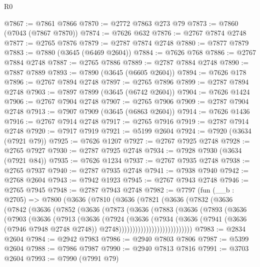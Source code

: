 \begin{lexlean}{R0}
\begin{coremodule}
@7867 := @7861 @7866
@7870 := @2772 @7863 @273 @79
@7873 := @7860 (@7043 (@7867 @7870))
@7874 := @7626 @632
@7876 := @2767 @7874 @2748
@7877 := @2765 @7876
@7879 := @2787 @7874 @2748
@7880 := @7877 @7879
@7883 := @7880 (@3645 (@6469 @2604))
@7884 := @7626 @768
@7886 := @2767 @7884 @2748
@7887 := @2765 @7886
@7889 := @2787 @7884 @2748
@7890 := @7887 @7889
@7893 := @7890 (@3645 (@6605 @2604))
@7894 := @7626 @178
@7896 := @2767 @7894 @2748
@7897 := @2765 @7896
@7899 := @2787 @7894 @2748
@7903 := @7897 @7899 (@3645 (@6742 @2604))
@7904 := @7626 @1424
@7906 := @2767 @7904 @2748
@7907 := @2765 @7906
@7909 := @2787 @7904 @2748
@7913 := @7907 @7909 (@3645 (@6863 @2604))
@7914 := @7626 @1436
@7916 := @2767 @7914 @2748
@7917 := @2765 @7916
@7919 := @2787 @7914 @2748
@7920 := @7917 @7919
@7921 := @5199 @2604
@7924 := @7920 (@3634 (@7921 @79))
@7925 := @7626 @1207
@7927 := @2767 @7925 @2748
@7928 := @2765 @7927
@7930 := @2787 @7925 @2748
@7934 := @7928 @7930 (@3634 (@7921 @84))
@7935 := @7626 @1234
@7937 := @2767 @7935 @2748
@7938 := @2765 @7937
@7940 := @2787 @7935 @2748
@7941 := @7938 @7940
@7942 := @2768 @2604
@7943 := @7942 @1923
@7945 := @2767 @7943 @2748
@7946 := @2765 @7945
@7948 := @2787 @7943 @2748
@7982 := @7797
    (fun (__b : @2705) =>
    @7800
      (@3636
        (@7810
          (@3636
            (@7821
              (@3636
                (@7832
                  (@3636
                    (@7842
                      (@3636
                        (@7852
                          (@3636
                            (@7873
                              (@3636
                                (@7883
                                  (@3636
                                    (@7893
                                      (@3636
                                        (@7903
                                          (@3636
                                            (@7913
                                              (@3636
                                                (@7924
                                                  (@3636
                                                    (@7934
                                                      (@3636
                                                        (@7941
                                                          (@3636 (@7946 @7948 @2748 @2748))
                                                          @2748)))))))))))))))))))))))))))
@7983 := @2834 @2604
@7984 := @2942 @7983
@7986 := @2940 @7803 @7806
@7987 := @5399 @2604
@7988 := @7986 @7987
@7990 := @2940 @7813 @7816
@7991 := @3703 @2604
@7993 := @7990 (@7991 @79)

\end{coremodule}
\end{lexlean}
